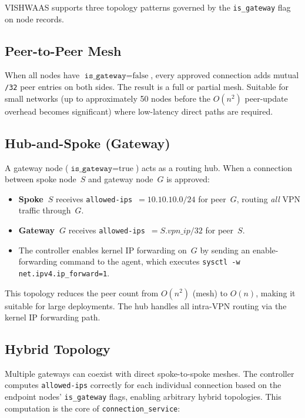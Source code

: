 \documentclass[conference]{IEEEtran}
\begin{document}
VISHWAAS supports three topology patterns governed by the \texttt{is\_gateway}
flag on node records.

\subsection{Peer-to-Peer Mesh}

When all nodes have $\texttt{is\_gateway} = \text{false}$, every approved
connection adds mutual \texttt{/32} peer entries on both sides.  The result is a
full or partial mesh.  Suitable for small networks (up to approximately 50 nodes
before the $O(n^2)$ peer-update overhead becomes significant) where low-latency
direct paths are required.

\subsection{Hub-and-Spoke (Gateway)}

A gateway node ($\texttt{is\_gateway} = \text{true}$) acts as a routing hub.
When a connection between spoke node~$S$ and gateway node~$G$ is approved:
\begin{itemize}
  \item \textbf{Spoke~$S$} receives \texttt{allowed-ips}~$= 10.10.10.0/24$ for
        peer~$G$, routing \emph{all} VPN traffic through~$G$.
  \item \textbf{Gateway~$G$} receives \texttt{allowed-ips}~$= S.\textit{vpn\_ip}/32$
        for peer~$S$.
  \item The controller enables kernel IP forwarding on~$G$ by sending an
        enable-forwarding command to the agent, which executes
        \texttt{sysctl -w net.ipv4.ip\_forward=1}.
\end{itemize}

This topology reduces the peer count from $O(n^2)$ (mesh) to $O(n)$, making it
suitable for large deployments. The hub handles all intra-VPN routing via the
kernel IP forwarding path.

\subsection{Hybrid Topology}

Multiple gateways can coexist with direct spoke-to-spoke meshes. The controller
computes \texttt{allowed-ips} correctly for each individual connection based on
the endpoint nodes' \texttt{is\_gateway} flags, enabling arbitrary hybrid
topologies. This computation is the core of \texttt{connection\_service}:
\end{document}
